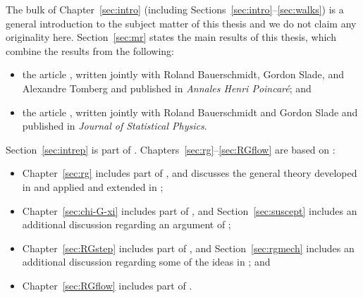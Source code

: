 The bulk of Chapter~\ref{sec:intro} (including Sections~\ref{sec:intro}--\ref{sec:walks})
is a general introduction to the
subject matter of this thesis and we do not claim any originality here. Section~\ref{sec:mr}
states the main results of this thesis, which combine the results from the following:
\begin{itemize}
\item
the article \cite{BSTW-clp}, written jointly with
Roland Bauerschmidt, Gordon Slade, and Alexandre Tomberg and
published in \textit{Annales Henri Poincar\'{e}};
and

\item
the article \cite{BSW-saw-sa}, written jointly with
Roland Bauerschmidt and Gordon Slade and published
in \textit{Journal of Statistical Physics}.
\end{itemize}
Section~\ref{sec:intrep} is part of \cite{BSW-saw-sa}.
Chapters~\ref{sec:rg}--\ref{sec:RGflow} are based on \cite{BSTW-clp,BSW-saw-sa}:
\begin{itemize}
\item
Chapter~\ref{sec:rg} includes part of \cite{BSTW-clp,BSW-saw-sa},
and discusses the general theory developed in
\cite{BS-rg-norm,BS-rg-loc,BBS-rg-pt,BS-rg-IE,BS-rg-step}
and applied and extended in
\cite{BBS-saw4-log,BBS-saw4,ST-phi4};

\item
Chapter~\ref{sec:chi-G-xi} includes part of \cite{BSTW-clp,BSW-saw-sa},
and Section~\ref{sec:suscept} includes an additional discussion regarding an argument
of \cite{BBS-saw4-log};

\item
Chapter~\ref{sec:RGstep} includes part of \cite{BSTW-clp}, and
Section~\ref{sec:rgmech} includes an additional discussion regarding some of the ideas in
\cite{BS-rg-step}; and

\item
Chapter~\ref{sec:RGflow} includes part of \cite{BSW-saw-sa}.
\end{itemize}




